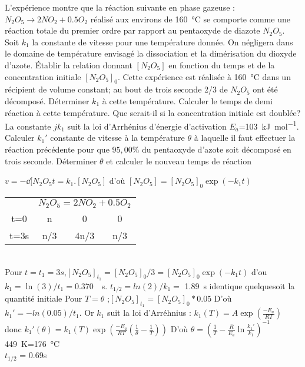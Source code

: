 \begin{Exercise}[title=Décomposition de $N_2O_5$]
	L'expérience montre que la réaction suivante en phase gazeuse : $N_2O_5 \to 2 NO_2 + 0.5 O_2$ réalisé aux environs de \SI{160}{\celsius} se comporte comme une réaction totale du premier ordre par rapport au pentaoxyde de diazote $N_2O_5$. Soit $k_1$ la constante de vitesse pour une température donnée. On négligera dans le domaine de température envisagé la dissociation et la dimérisation du dioxyde d'azote.
	\Question Établir la relation donnant $[N_2O_5]$ en fonction du temps et de la concentration initiale $[N_2O_5]_0$.
	\Question Cette expérience est réalisée à \SI{160}{\celsius} dans un récipient de volume constant; au bout de trois seconde 2/3 de $N_2O_5$ ont été décomposé. Déterminer $k_1$ à cette température.
	\Question Calculer le temps de demi réaction à cette température. Que serait-il si la concentration initiale est doublée?
	\Question La constante $jk_1$ suit la loi d'Arrhénius d'énergie d'activation $E_a$=\SI{103}{kJ\per\mol}.
	\subQuestion Calculer $k_1'$ constante de vitesse à la température $\theta$ à laquelle il faut effectuer la réaction précédente pour que $95,00\%$ du pentaoxyde d'azote soit décomposé en trois seconde.
	\subQuestion Déterminer $\theta$ et calculer le nouveau temps de réaction
\end{Exercise}
\begin{Answer}
	\Question $v=-\dd{[N_2O_5}{t} = k_1.[N_2O_5]$ d'où $[N_2O_5]=[N_2O_5]_0 \exp(-k_1t) $
	\Question ~ \\
	\begin{tabular}{cccc}
		     & \multicolumn{3}{l}{$N_2O_5 = 2NO_2 + 0.5 O_2$}              \\
		t=0  & n                                              & 0    & 0   \\
		t=3s & n/3                                            & 4n/3 & n/3 \\
	\end{tabular}\\
	Pour $t=t_1=3s$,$[N_2O_5]_{t_1}=[N_2O_5]_0 /3 = [N_2O_5]_0 \exp(-k_1t)$ d'ou $k_1=\ln(3)/t_1=$\SI{0.370}{\per\s}.
	\Question
	$t_{1/2} = ln(2)/k_1 =$ \SI{1.89}{s}
	identique quelquesoit la quantité initiale
	\Question
	Pour $T= \theta$ ;$[N_2O_5]_{t_1}=[N_2O_5]_0 *0.05$ D'où $ k_1'= -ln(0.05)/t_1$.
	Or $k_1$ suit la loi d'Arréhnius : $k_1(T) = A \exp(\frac{-E_a}{RT})$ donc $k_1'(\theta) =k_1(T)\exp\left(\frac{-E_a}{RT}\left(\frac{1}{\theta}-\frac{1}{T}\right)\right)$
	D'où $\theta = \left(\frac{1}{T} -\frac{R}{E_a}\ln\frac{k_1'}{k_1}\right)^{-1}$\SI{449}{K}=\SI{176}{\celsius}\\
	$t_{1/2}$ = 0.69s
\end{Answer}
